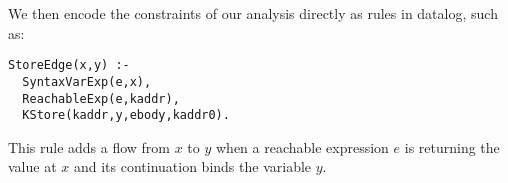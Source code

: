 We then encode the constraints of our analysis directly as rules in datalog, such as:
%
\begin{Verbatim}
StoreEdge(x,y) :-
  SyntaxVarExp(e,x),
  ReachableExp(e,kaddr),
  KStore(kaddr,y,ebody,kaddr0).
\end{Verbatim}
%
This rule adds a flow from $x$ to $y$ when a reachable expression $e$ is returning the value at $x$ and
its continuation binds the variable $y$.

